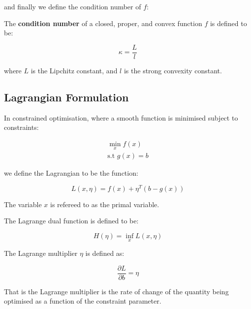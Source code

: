 and finally we define the condition number of \(f\):

\begin{definition}
The \textbf{condition number} of a closed, proper, and convex function \(f\) is defined to be:

\begin{equation}
\kappa = \frac{L}{l}
\end{equation}

where \(L\) is the Lipchitz constant, and \(l\) is the strong convexity constant.

\end{definition}

\subsection{Lagrangian Formulation}
\begin{definition}[Lagrangian]
In constrained optimisation, where a smooth function is minimised subject to constraints:

\begin{eqnarray}
\min_x f\left(x\right) \\
\text{s.t } g\left(x\right) = b
\end{eqnarray}

we define the Lagrangian to be the function:

\begin{equation}
L\left(x, \eta\right) = f\left(x\right) + \eta^T\left(b-g\left(x\right)\right)
\end{equation}

The variable \(x\) is refereed to as the primal variable.

\end{definition}

\begin{definition}
The Lagrange dual function is defined to be:

\begin{equation}
H\left(\eta\right) = \inf_x L\left(x, \eta\right)
\end{equation}

\end{definition}

\begin{definition}
The Lagrange multiplier \(\eta\) is defined as:

\begin{equation}
\frac{\partial L}{\partial b} = \eta
\end{equation}

That is the Lagrange multiplier is the rate of change of the quantity being optimised as a function of the constraint parameter.

\end{definition}

